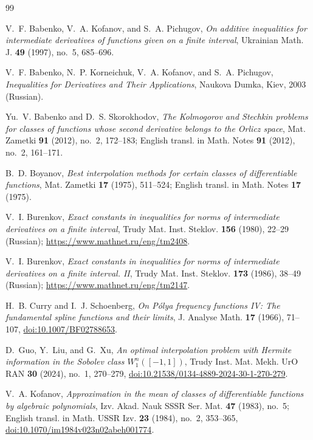 \documentclass[11pt,a4paper]{article}
\theoremstyle{remark}
\numberwithin{equation}{section}
\begin{document}
\begin{thebibliography}{99}

V.~F. Babenko, V.~A. Kofanov, and S.~A. Pichugov,
\emph{On additive inequalities for intermediate derivatives of functions given on a finite interval},
Ukrainian Math. J. \textbf{49} (1997), no.~5, 685--696.

V.~F. Babenko, N.~P. Korneichuk, V.~A. Kofanov, and S.~A. Pichugov,
\emph{Inequalities for Derivatives and Their Applications},
Naukova Dumka, Kiev, 2003 (Russian).

Yu.~V. Babenko and D.~S. Skorokhodov,
\emph{The Kolmogorov and Stechkin problems for classes of functions whose second derivative belongs to the Orlicz space},
Mat. Zametki \textbf{91} (2012), no.~2, 172--183; English transl. in Math. Notes \textbf{91} (2012), no.~2, 161--171.

B.~D. Boyanov,
\emph{Best interpolation methods for certain classes of differentiable functions},
Mat. Zametki \textbf{17} (1975), 511--524; English transl. in Math. Notes \textbf{17} (1975).

V.~I. Burenkov,
\emph{Exact constants in inequalities for norms of intermediate derivatives on a finite interval},
Trudy Mat. Inst. Steklov. \textbf{156} (1980), 22--29 (Russian); \url{https://www.mathnet.ru/eng/tm2408}.

V.~I. Burenkov,
\emph{Exact constants in inequalities for norms of intermediate derivatives on a finite interval. II},
Trudy Mat. Inst. Steklov. \textbf{173} (1986), 38--49 (Russian); \url{https://www.mathnet.ru/eng/tm2147}.

H.~B. Curry and I.~J. Schoenberg,
\emph{On P\'olya frequency functions IV: The fundamental spline functions and their limits},
J. Analyse Math. \textbf{17} (1966), 71--107, \href{https://doi.org/10.1007/BF02788653}{doi:10.1007/BF02788653}.

D.~Guo, Y.~Liu, and G.~Xu,
\emph{An optimal interpolation problem with Hermite information in the Sobolev class $W_1^n([-1,1])$},
Trudy Inst. Mat. Mekh. UrO RAN \textbf{30} (2024), no.~1, 270--279, \href{https://doi.org/10.21538/0134-4889-2024-30-1-270-279}{doi:10.21538/0134-4889-2024-30-1-270-279}.

V.~A. Kofanov,
\emph{Approximation in the mean of classes of differentiable functions by algebraic polynomials},
Izv. Akad. Nauk SSSR Ser. Mat. \textbf{47} (1983), no.~5; English transl. in Math. USSR Izv. \textbf{23} (1984), no.~2, 353--365, \href{https://doi.org/10.1070/im1984v023n02abeh001774}{doi:10.1070/im1984v023n02abeh001774}.


\end{thebibliography}
\end{document}
